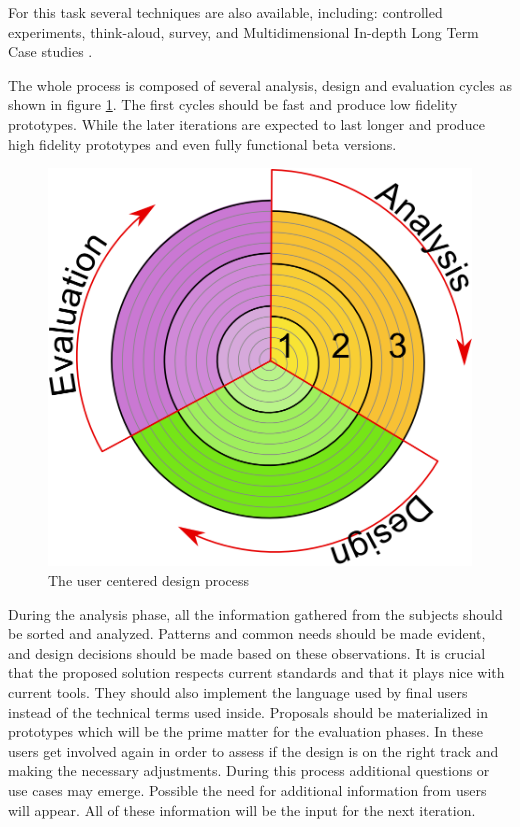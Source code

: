 For this task several techniques are also available, including: controlled experiments, think-aloud, survey, and Multidimensional In-depth Long Term Case studies \autocite{shneiderman_strategies_2006}.

\smallskip

The whole process is composed of several analysis, design and evaluation cycles as shown in figure \ref{intro_spiral}. The first cycles should be fast and produce low fidelity prototypes. While the later iterations are expected to last longer and produce high fidelity prototypes and even fully functional beta versions. 

\begin{figure}
\includegraphics[scale=1]{figures/espiral2.png} 
\caption{ \label{intro_spiral} The user centered design process}
\end{figure}

During the analysis phase, all the information gathered from the subjects should be sorted and analyzed. Patterns and common needs should be made evident, and design decisions should be made based on these observations. It is crucial that the proposed solution respects current standards and that it plays nice with current tools. They should also implement the language used by final users instead of the technical terms used inside.  Proposals should be materialized in prototypes which will be the prime matter for the evaluation phases. In these users get involved again in order to assess if the design is on the right track and making the necessary adjustments. During this process additional questions or use cases may emerge. Possible the need for additional information from users will appear. All of these information will be the input for the next iteration.

